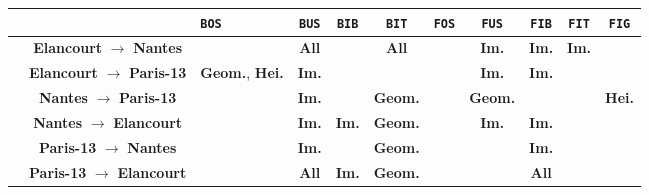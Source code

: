        \begin{table}[htbp]
            \footnotesize 
            \centering
            \renewcommand{\arraystretch}{2}
            \begin{tabular}{| c | c | x{1.5cm} c c c |c c c c c|}
                \hline
                &&\texttt{BOS} & \texttt{BUS}&\texttt{BIB}&\texttt{BIT}&\texttt{FOS} & \texttt{FUS}&\texttt{FIB}&\texttt{FIT}&\texttt{FIG}\\
                \hline
                & \textbf{Elancourt} \(\rightarrow\) \textbf{Nantes} &  &  \textbf{All} &  &  \textbf{All} &  &  \textbf{Im.} &  \textbf{Im.} &  \textbf{Im.} &  \\
                & \textbf{Elancourt} \(\rightarrow\) \textbf{Paris-13} &  \textbf{Geom.}, \textbf{Hei.} &  \textbf{Im.} &  &  &  &  \textbf{Im.} &  \textbf{Im.} &  &  \\
                & \textbf{Nantes} \(\rightarrow\) \textbf{Paris-13} &  &  \textbf{Im.} &  &  \textbf{Geom.} &  &  \textbf{Geom.} &  &  &  \textbf{Hei.} \\
                & \textbf{Nantes} \(\rightarrow\) \textbf{Elancourt} &  &  \textbf{Im.} &  \textbf{Im.} &  \textbf{Geom.} &  &  \textbf{Im.} &  \textbf{Im.} &  &  \\
                & \textbf{Paris-13} \(\rightarrow\) \textbf{Nantes} &  &  \textbf{Im.} &  &  \textbf{Geom.} &  &  &  \textbf{Im.} &  &  \\
                & \textbf{Paris-13} \(\rightarrow\) \textbf{Elancourt} &  &  \textbf{All} &  \textbf{Im.} &  \textbf{Geom.} &  &  &  \textbf{All} & & \\

\end{tabular}
\end{table}
